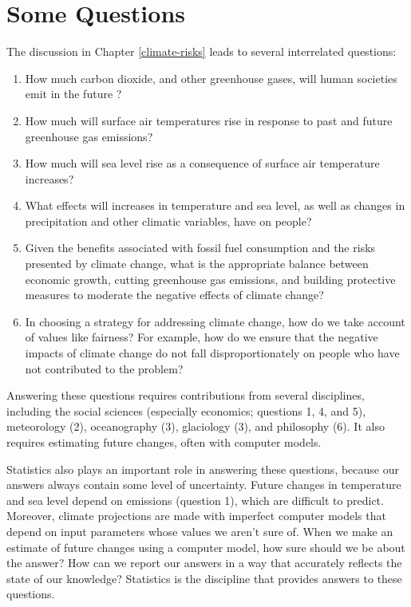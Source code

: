 \documentclass[
  11pt,
]{book}
\providecommand{\tightlist}{%
  \setlength{\itemsep}{0pt}\setlength{\parskip}{0pt}}
\begin{document}
\hypertarget{some-questions}{%
\section{Some Questions}\label{some-questions}}

The discussion in Chapter \ref{climate-risks} leads to several interrelated questions:

\begin{enumerate}
\def\labelenumi{\arabic{enumi}.}
\tightlist
\item
  How much carbon dioxide, and other greenhouse gases, will human societies emit in the future \citep[e.g.~][]{Sanford2014-rr}?
\item
  How much will surface air temperatures rise in response to past and future greenhouse gas emissions?
\item
  How much will sea level rise as a consequence of surface air temperature increases?
\item
  What effects will increases in temperature and sea level, as well as changes in precipitation and other climatic variables, have on people?
\item
  Given the benefits associated with fossil fuel consumption and the risks presented by climate change, what is the appropriate balance between economic growth, cutting greenhouse gas emissions, and building protective measures to moderate the negative effects of climate change?
\item
  In choosing a strategy for addressing climate change, how do we take account of values like fairness? For example, how do we ensure that the negative impacts of climate change do not fall disproportionately on people who have not contributed to the problem?
\end{enumerate}

Answering these questions requires contributions from several disciplines, including the social sciences (especially economics; questions 1, 4, and 5), meteorology (2), oceanography (3), glaciology (3), and philosophy (6). It also requires estimating future changes, often with computer models.

Statistics also plays an important role in answering these questions, because our answers always contain some level of uncertainty. Future changes in temperature and sea level depend on emissions (question 1), which are difficult to predict. Moreover, climate projections are made with imperfect computer models that depend on input parameters whose values we aren't sure of. When we make an estimate of future changes using a computer model, how sure should we be about the answer? How can we report our answers in a way that accurately reflects the state of our knowledge? Statistics is the discipline that provides answers to these questions.
\end{document}
